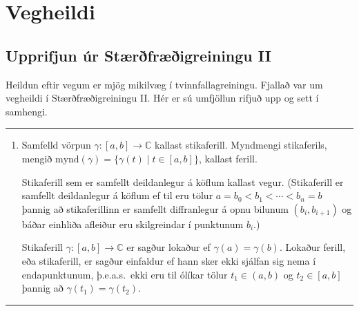 \documentclass[a4paper,10pt,icelandic]{sphinxmanual}
\begin{document}
\section{Vegheildi}
\label{\detokenize{Kafli03:vegheildi}}

\subsection{Upprifjun úr Stærðfræðigreiningu II}
\label{\detokenize{Kafli03:upprifjun-ur-staerfraeigreiningu-ii}}
Heildun eftir vegum er mjög mikilvæg í tvinnfallagreiningu. Fjallað var um vegheildi í Stærðfræðigreiningu II. Hér er sú umfjöllun rifjuð upp og sett í samhengi.


\bigskip\hrule\bigskip

\begin{enumerate}
%
\item {} 
Samfelld vörpun \(\gamma:[a,b]\rightarrow {\mathbb{C}}\) kallast stikaferill. Myndmengi stikaferils, mengið \(\mbox{mynd}(\gamma)=\{\gamma(t)\mid t\in [a,b]\}\), kallast ferill.

Stikaferill sem er samfellt deildanlegur á köflum kallast vegur. (Stikaferill er samfellt deildanlegur á köflum ef til eru tölur \(a=b_0<b_1<\cdots<b_n=b\) þannig að stikaferillinn er samfellt diffranlegur á opnu bilunum \((b_i, b_{i+1})\) og báðar einhliða afleiður eru skilgreindar í punktunum \(b_i\).)

Stikaferill \(\gamma:[a,b]\rightarrow {\mathbb{C}}\) er sagður lokaður ef \(\gamma(a)=\gamma(b)\). Lokaður ferill, eða stikaferill, er sagður einfaldur ef hann sker ekki sjálfan sig nema í endapunktunum, þ.e.a.s. ekki eru til ólíkar tölur \(t_1\in (a,b)\) og \(t_2\in [a,b]\) þannig að \(\gamma(t_1)=\gamma(t_2)\).

\end{enumerate}


\bigskip\hrule\bigskip
\end{document}
